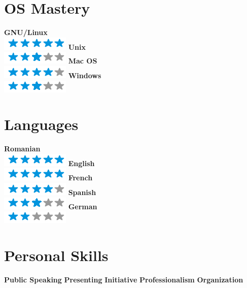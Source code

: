 \documentclass[]{friggeri-cv}
\begin{document}
\begin{aside}
  \section{OS Mastery}
    \textbf{GNU/Linux}\\ \includegraphics[scale=0.30]{img/5stars.png}
    \textbf{Unix}\\ \includegraphics[scale=0.30]{img/3stars.png}
    \textbf{Mac OS}\\\includegraphics[scale=0.30]{img/4stars.png}
    \textbf{Windows}\\ \includegraphics[scale=0.30]{img/3stars.png}
    ~
  
  \section{Languages}
    \textbf{Romanian}\\ \includegraphics[scale=0.30]{img/5stars.png}
    \textbf{English}\\ \includegraphics[scale=0.30]{img/5stars.png}
    \textbf{French}\\ \includegraphics[scale=0.30]{img/4stars.png}
    \textbf{Spanish}\\ \includegraphics[scale=0.30]{img/3stars.png}
    \textbf{German}\\ \includegraphics[scale=0.30]{img/2stars.png}
    ~

  \section{Personal Skills}
    \textbf{Public Speaking}
    \textbf{Presenting}
    \textbf{Initiative}
    \textbf{Professionalism}
    \textbf{Organization}    
    ~
    
\end{aside}
\end{document}
